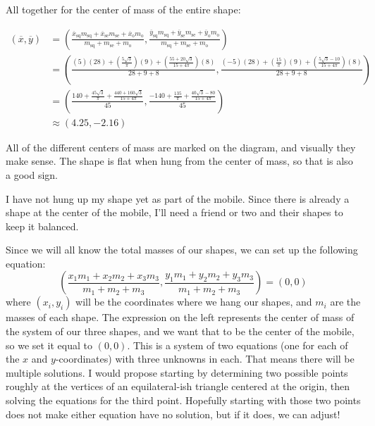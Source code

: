 \documentclass[12pt]{amsart}
\begin{document}
All together for the center of mass of the entire shape:

\begin{align*}
\left(\overline{x}, \overline{y} \right) & = \left( \frac{\overline{x}_{\text{sq}}m_{\text{sq}} + \overline{x}_{\text{se}}m_{\text{se}} + \overline{x}_{\text{o}}m_{\text{o}}}{m_{\text{sq}} + m_{\text{se}} + m_{\text{o}}}, \frac{\overline{y}_{\text{sq}}m_{\text{sq}} + \overline{y}_{\text{se}}m_{\text{se}} + \overline{y}_{\text{o}}m_{\text{o}}}{m_{\text{sq}} + m_{\text{se}} + m_{\text{o}}}\right)\\
& = \left( \frac{(5)(28) + \left(\frac{5\sqrt{3}}{\pi}\right)(9) + \left(\frac{55 + 20\sqrt{3}}{15 + 4\pi}\right)(8)}{28 + 9 + 8}, \frac{(-5)(28) + \left(\frac{15}{\pi}\right)(9) + \left(\frac{5\sqrt{3} - 10}{15 + 4\pi}\right)(8)}{28 + 9 + 8}\right)\\
& = \left(\frac{140 + \frac{45\sqrt{3}}{\pi} + \frac{440 + 160\sqrt{3}}{15 + 4\pi}}{45}, \frac{-140 + \frac{135}{\pi} + \frac{40\sqrt{3} - 80}{15 + 4\pi}}{45}\right)\\
& \approx \left(4.25 , -2.16\right)
\end{align*}



All of the different centers of mass are marked on the diagram, and visually they make sense.  The shape is flat when hung from the center of mass, so that is also a good sign.

I have not hung up my shape yet as part of the mobile.  Since there is already a shape at the center of the mobile, I'll need a friend or two and their shapes to keep it balanced.  

Since we will all know the total masses of our shapes, we can set up the following equation:
$$\left(\frac{x_1m_1 + x_2m_2 + x_3m_3}{m_1 + m_2 + m_3}, \frac{y_1m_1 + y_2m_2 + y_3m_3}{m_1 + m_2 + m_3} \right) = (0,0)$$
where $(x_i, y_i)$ will be the coordinates where we hang our shapes, and $m_i$ are the masses of each shape.  The expression on the left represents the center of mass of the system of our three shapes, and we want that to be the center of the mobile, so we set it equal to $(0,0)$.  This is a system of two equations (one for each of the $x$ and $y$-coordinates) with three unknowns in each.  That means there will be multiple solutions.  I would propose starting by determining two possible points roughly at the vertices of an equilateral-ish triangle centered at the origin, then solving the equations for the third point.  Hopefully starting with those two points does not make either equation have no solution, but if it does, we can adjust!
\end{document}
